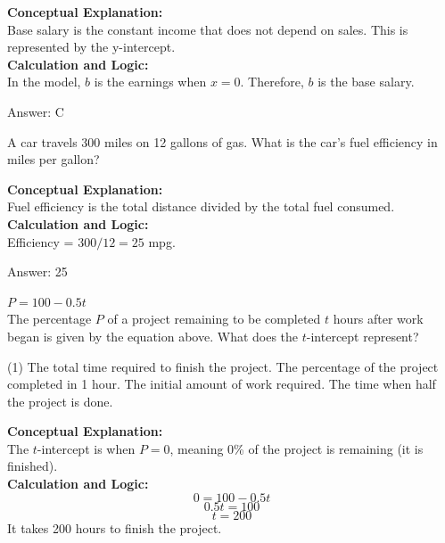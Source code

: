 \documentclass[11pt,paper=a4,answers]{exam}
\begin{document}
\begin{questions}
\begin{solution}
\textbf{Conceptual Explanation:} \\
Base salary is the constant income that does not depend on sales. This is represented by the y-intercept.
\\[10pt]
\textbf{Calculation and Logic:} \\
In the model, $b$ is the earnings when $x = 0$. Therefore, $b$ is the base salary.

\vspace{15pt}
Answer: \colorbox{yellow!100}{C}
\end{solution}

\question
A car travels 300 miles on 12 gallons of gas. What is the car's fuel efficiency in miles per gallon?

\begin{solution}
\textbf{Conceptual Explanation:} \\
Fuel efficiency is the total distance divided by the total fuel consumed.
\\[10pt]
\textbf{Calculation and Logic:} \\
Efficiency = $300 / 12 = 25$ mpg.

\vspace{15pt}
Answer: \colorbox{yellow!100}{25}
\end{solution}

\question
$P = 100 - 0.5t$ \\
The percentage $P$ of a project remaining to be completed $t$ hours after work began is given by the equation above. What does the $t$-intercept represent?
\begin{tasks}(1)
    \task The total time required to finish the project.
    \task The percentage of the project completed in 1 hour.
    \task The initial amount of work required.
    \task The time when half the project is done.
\end{tasks}

\begin{solution}
\textbf{Conceptual Explanation:} \\
The $t$-intercept is when $P = 0$, meaning 0\% of the project is remaining (it is finished).
\\[10pt]
\textbf{Calculation and Logic:} \\
\[0 = 100 - 0.5t\]
\[0.5t = 100\]
\[t = 200\]
It takes 200 hours to finish the project.


\end{solution}
\end{questions}
\end{document}

